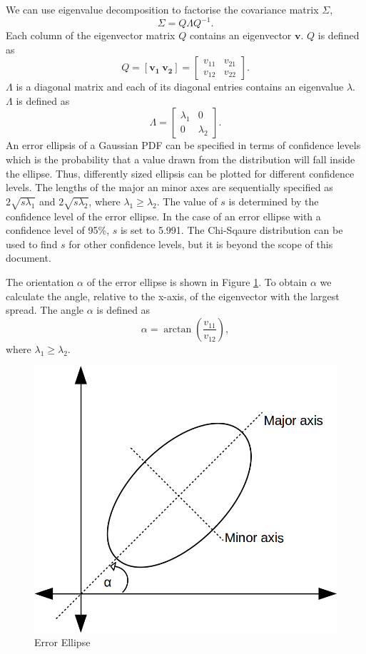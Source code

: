 \documentclass[12pt,oneside,openany,a4paper, %
afrikaans,english,
]{memoir}
\numberwithin{equation}{chapter}
\begin{document}
We can use eigenvalue decomposition to factorise the covariance matrix $\Sigma$,
\begin{equation}
\Sigma = Q\Lambda Q^{-1}.
\end{equation}
Each column of the eigenvector matrix $Q$ contains an eigenvector $\bm{v}$. $Q$ is defined as
\begin{equation}
Q =
[\bm{v_1} \ \bm{v_2}]
=
\begin{bmatrix}
v_{11} & v_{21}\\
v_{12} & v_{22}
\end{bmatrix}.
\end{equation}
$\Lambda$ is a diagonal matrix and each of its diagonal entries contains an eigenvalue $\lambda$. $\Lambda$ is defined as 
\begin{equation}
\Lambda =
\begin{bmatrix}
\lambda_1 & 0\\
0 & \lambda_2
\end{bmatrix}.
\end{equation}
An error ellipsis of a Gaussian PDF can be specified in terms of confidence levels which is the probability that a value drawn from the distribution will fall inside the ellipse. Thus, differently sized ellipsis can be plotted for different confidence levels. The lengths of the major an minor axes are sequentially specified as $2\sqrt{s\lambda_1}$ and $2\sqrt{s\lambda_2}$, where $\lambda_1 \geq \lambda_2$. The value of $s$ is determined by the confidence level of the error ellipse. In the case of an error ellipse with a confidence level of 95\%, $s$ is set to 5.991. The Chi-Sqaure distribution can be used to find $s$ for other confidence levels, but it is beyond the scope of this document.

The orientation $\alpha$ of the error ellipse is shown in Figure \ref{fig:e_ellipse}. To obtain $\alpha$ we calculate the angle, relative to the x-axis, of the eigenvector with the largest spread. The angle $\alpha$ is defined as
\begin{equation}
\alpha = \arctan\left(\frac{v_{11}}{v_{12}}\right),
\end{equation}
where $\lambda_1 \geq \lambda_2$.

\begin{figure}[H]
  \includegraphics[width=0.5\linewidth]{Figures/e_ellipse.png}
  \centering
  \caption{Error Ellipse}
  \label{fig:e_ellipse}
\end{figure}
\end{document}
